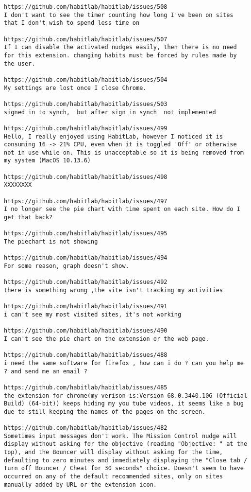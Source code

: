 \begin{lstlisting}[breaklines]
https://github.com/habitlab/habitlab/issues/508
I don't want to see the timer counting how long I've been on sites that I don't wish to spend less time on

https://github.com/habitlab/habitlab/issues/507
If I can disable the activated nudges easily, then there is no need for this extension. changing habits must be forced by rules made by the user.

https://github.com/habitlab/habitlab/issues/504
My settings are lost once I close Chrome.

https://github.com/habitlab/habitlab/issues/503
signed in to synch,  but after sign in synch  not implemented

https://github.com/habitlab/habitlab/issues/499
Hello, I really enjoyed using HabitLab, however I noticed it is consuming 16 -> 21% CPU, even when it is toggled 'Off' or otherwise not in use while on. This is unacceptable so it is being removed from my system (MacOS 10.13.6)

https://github.com/habitlab/habitlab/issues/498
XXXXXXXX

https://github.com/habitlab/habitlab/issues/497
I no longer see the pie chart with time spent on each site. How do I get that back?

https://github.com/habitlab/habitlab/issues/495
The piechart is not showing

https://github.com/habitlab/habitlab/issues/494
For some reason, graph doesn't show.

https://github.com/habitlab/habitlab/issues/492
there is something wrong ,the site isn't tracking my activities

https://github.com/habitlab/habitlab/issues/491
i can't see my most visited sites, it's not working

https://github.com/habitlab/habitlab/issues/490
I can't see the pie chart on the extension or the web page.

https://github.com/habitlab/habitlab/issues/488
i need the same software for firefox , how can i do ? can you help me ? and send me an email ?

https://github.com/habitlab/habitlab/issues/485
the extension for chrome(my verison is:Version 68.0.3440.106 (Official Build) (64-bit)) keeps hiding my you tube videos, it seems like a bug due to still keeping the names of the pages on the screen.

https://github.com/habitlab/habitlab/issues/482
Sometimes input messages don't work. The Mission Control nudge will display without asking for the objective (reading "Objective: " at the top), and the Bouncer will display without asking for the time, defaulting to zero minutes and immediately displaying the "Close tab / Turn off Bouncer / Cheat for 30 seconds" choice. Doesn't seem to have occurred on any of the default recommended sites, only on sites manually added by URL or the extension icon.


\end{lstlisting}
